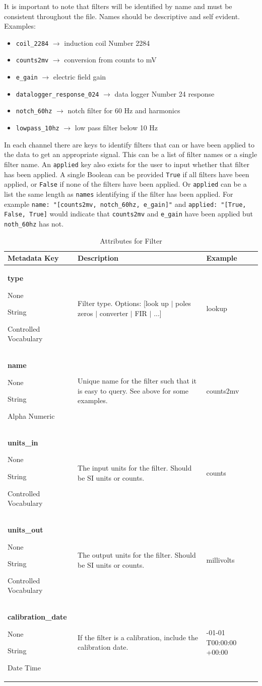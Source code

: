 \documentclass[12pt]{article}
\newcommand{\True}[0]{{\color{Red}{\textbf{True}}}}
\newcommand{\entry}[7]{
	\textbf{#1} 
	\begin{itemize}[topsep=5pt,itemsep=-.1pt,parsep=-2pt,partopsep=0pt,labelwidth=2em,align=left,itemindent=1em]
		\begin{small}
			\item[Required:] #2
			\item[Units:] #3
			\item[Type:] #4
			\item[Style:] #5
		\end{small}
	\end{itemize} & #6 & #7 \\ \midrule}
\begin{document}
It is important to note that filters will be identified by name and must be consistent throughout the file. Names should be descriptive and self evident. Examples:
\begin{itemize}
    \item \verb|coil_2284| $\longrightarrow$ induction coil Number 2284
    \item \verb|counts2mv| $\longrightarrow$ conversion from counts to mV
    \item \verb|e_gain| $\longrightarrow$ electric field gain 
    \item \verb|datalogger_response_024| $\longrightarrow$ data logger Number 24 response
    \item \verb|notch_60hz| $\longrightarrow$ notch filter for 60 Hz and harmonics
    \item \verb|lowpass_10hz| $\longrightarrow$ low pass filter below 10 Hz
\end{itemize}

In each channel there are keys to identify filters that can or have been applied to the data to get an appropriate signal.  This can be a list of filter names or a single filter name.  An \verb|applied| key also exists for the user to input whether that filter has been applied.  A single Boolean can be provided \verb|True| if all filters have been applied, or \verb|False| if none of the filters have been applied.  Or \verb|applied| can be a list the same length as \verb|names| identifying if the filter has been applied.  For example \verb|name: "[counts2mv, notch_60hz, e_gain]"| and \verb|applied: "[True, False, True]| would indicate that \verb|counts2mv| and \verb|e_gain| have been applied but \verb|noth_60hz| has not. 

\begin{table}[h!]
	\caption[Attributes for Filter ]{Attributes for Filter }
	\begin{tabular}{p{}>{\raggedright}p{}>{\raggedright\arraybackslash}p{}}
		\textbf{Metadata Key} & \textbf{Description} & \textbf{Example} \\ \toprule
		\entry{type}{\True}{None}{String}{Controlled Vocabulary}{Filter type. Options: [look up $|$ poles zeros $|$ converter $|$ FIR $|$ ...] }{lookup}
		\entry{name}{\True}{None}{String}{Alpha Numeric}{Unique name for the filter such that it is easy to query.  See above for some examples.}{counts2mv}
		\entry{units\_in}{\True}{None}{String}{Controlled Vocabulary}{The input units for the filter. Should be SI units or counts.}{counts}
		\entry{units\_out}{\True}{None}{String}{Controlled Vocabulary}{The output units for the filter. Should be SI units or counts.}{millivolts}
		\entry{calibration\_date}{\True}{None}{String}{Date Time}{If the filter is a calibration, include the calibration date.}{2010-01-01 T00:00:00 +00:00}
	\end{tabular}
	\label{tab:filter}
\end{table}
\end{document}
